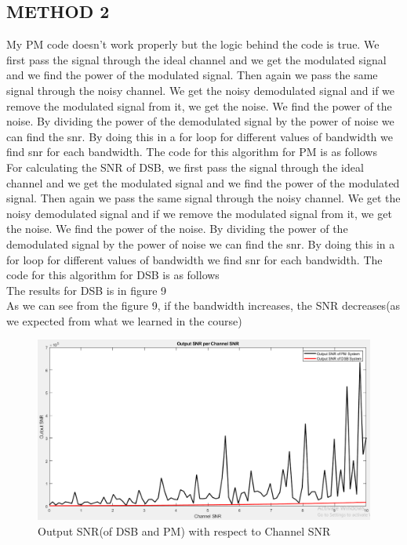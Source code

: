 \documentclass[11pt]{article}
\begin{document}
\begin{question}
\begin{subquestion}
{\section*{METHOD 2}
My PM code doesn't work properly but the logic behind the code is true. We first pass the signal through the ideal channel and we get the modulated signal and we find the power of the modulated signal. Then again we pass the same signal through the noisy channel. We get the noisy demodulated signal and if we remove the modulated signal from it, we get the noise. We find the power of the noise. By dividing the power of the demodulated signal by the power of noise we can find the snr. By doing this in a for loop for different values of bandwidth we find snr for each bandwidth. The code for this algorithm for PM is as follows \\

$$$$
For calculating the SNR of DSB, we first pass the signal through the ideal channel and we get the modulated signal and we find the power of the modulated signal. Then again we pass the same signal through the noisy channel. We get the noisy demodulated signal and if we remove the modulated signal from it, we get the noise. We find the power of the noise. By dividing the power of the demodulated signal by the power of noise we can find the snr. By doing this in a for loop for different values of bandwidth we find snr for each bandwidth. The code for this algorithm for DSB is as follows \\

$$$$
The results for DSB is in figure 9\\
As we can see from the figure 9, if the bandwidth increases, the SNR decreases(as we expected from what we learned in the course)
}
\begin{figure}[H]
\centering
\includegraphics[scale=0.6]{Fig/9.png}
\caption{Output SNR(of DSB and PM) with respect to Channel SNR}
\end{figure}


\end{subquestion}
\end{question}
\end{document}
